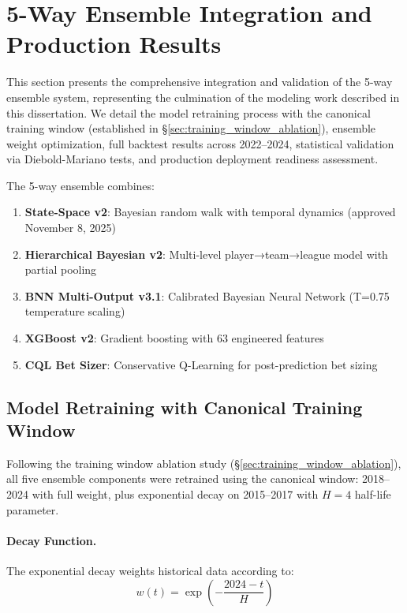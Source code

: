 \section{5-Way Ensemble Integration and Production Results}
\label{sec:5way-ensemble-production}

This section presents the comprehensive integration and validation of the 5-way ensemble system, representing the culmination of the modeling work described in this dissertation. We detail the model retraining process with the canonical training window (established in \S\ref{sec:training_window_ablation}), ensemble weight optimization, full backtest results across 2022--2024, statistical validation via Diebold-Mariano tests, and production deployment readiness assessment.

The 5-way ensemble combines:
\begin{enumerate}
  \item \textbf{State-Space v2}: Bayesian random walk with temporal dynamics (approved November 8, 2025)
  \item \textbf{Hierarchical Bayesian v2}: Multi-level player→team→league model with partial pooling
  \item \textbf{BNN Multi-Output v3.1}: Calibrated Bayesian Neural Network (T=0.75 temperature scaling)
  \item \textbf{XGBoost v2}: Gradient boosting with 63 engineered features
  \item \textbf{CQL Bet Sizer}: Conservative Q-Learning for post-prediction bet sizing
\end{enumerate}

\subsection{Model Retraining with Canonical Training Window}
\label{subsec:retraining-canonical}

Following the training window ablation study (\S\ref{sec:training_window_ablation}), all five ensemble components were retrained using the canonical window: 2018--2024 with full weight, plus exponential decay on 2015--2017 with $H=4$ half-life parameter.

\paragraph{Decay Function.}
The exponential decay weights historical data according to:
\begin{equation}
  w(t) = \exp\left(-\frac{2024 - t}{H}\right)
\end{equation}

